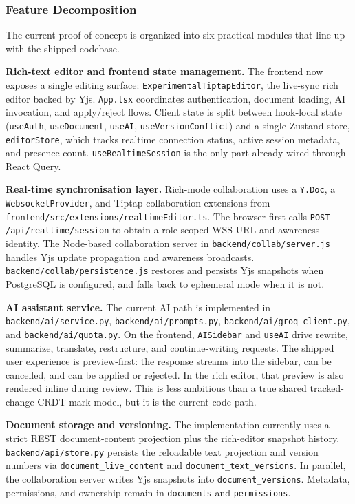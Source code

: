 \documentclass{article}
\begin{document}
\subsubsection{Feature Decomposition}
\noindent The current proof-of-concept is organized into six practical modules that line up with the shipped codebase.

\vspace{5pt}
\noindent\textbf{Rich-text editor and frontend state management.} The frontend now exposes a single editing surface: \texttt{ExperimentalTiptapEditor}, the live-sync rich editor backed by Yjs. \texttt{App.tsx} coordinates authentication, document loading, AI invocation, and apply/reject flows. Client state is split between hook-local state (\texttt{useAuth}, \texttt{useDocument}, \texttt{useAI}, \texttt{useVersionConflict}) and a single Zustand store, \texttt{editorStore}, which tracks realtime connection status, active session metadata, and presence count. \texttt{useRealtimeSession} is the only part already wired through React Query.

\vspace{5pt}
\noindent\textbf{Real-time synchronisation layer.} Rich-mode collaboration uses a \texttt{Y.Doc}, a \texttt{WebsocketProvider}, and Tiptap collaboration extensions from \texttt{frontend/src/extensions/realtimeEditor.ts}. The browser first calls \texttt{POST /api/realtime/session} to obtain a role-scoped WSS URL and awareness identity. The Node-based collaboration server in \texttt{backend/collab/server.js} handles Yjs update propagation and awareness broadcasts. \texttt{backend/collab/persistence.js} restores and persists Yjs snapshots when PostgreSQL is configured, and falls back to ephemeral mode when it is not.

\vspace{5pt}
\noindent\textbf{AI assistant service.} The current AI path is implemented in \texttt{backend/ai/service.py}, \texttt{backend/ai/prompts.py}, \texttt{backend/ai/groq\_client.py}, and \texttt{backend/ai/quota.py}. On the frontend, \texttt{AISidebar} and \texttt{useAI} drive rewrite, summarize, translate, restructure, and continue-writing requests. The shipped user experience is preview-first: the response streams into the sidebar, can be cancelled, and can be applied or rejected. In the rich editor, that preview is also rendered inline during review. This is less ambitious than a true shared tracked-change CRDT mark model, but it is the current code path.

\vspace{5pt}
\noindent\textbf{Document storage and versioning.} The implementation currently uses a strict REST document-content projection plus the rich-editor snapshot history. \texttt{backend/api/store.py} persists the reloadable text projection and version numbers via \texttt{document\_live\_content} and \texttt{document\_text\_versions}. In parallel, the collaboration server writes Yjs snapshots into \texttt{document\_versions}. Metadata, permissions, and ownership remain in \texttt{documents} and \texttt{permissions}.
\end{document}
